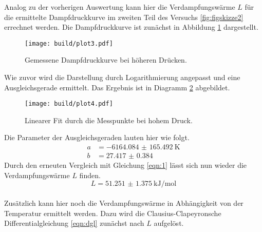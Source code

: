 Analog zu der vorherigen Auswertung kann hier die Verdampfungswärme $L$ für die ermittelte Dampfdruckkurve im zweiten Teil des Versuchs \ref{fig:figskizze2} errechnet werden.
Die Dampfdruckkurve ist zunächst in Abbildung \ref{fig:plot3} dargestellt.
\begin{figure}[h]
    \centering
    \texttt{[image: build/plot3.pdf]}
    \caption{Gemessene Dampfdruckkurve bei höheren Drücken.}
    \label{fig:plot3}
\end{figure}
Wie zuvor wird die Darstellung durch Logarithmierung angepasst und eine Ausgleichsgerade ermittelt. Das Ergebnis ist in Diagramm \ref{fig:plot4} abgebildet.
\begin{figure}[h]
    \centering
    \texttt{[image: build/plot4.pdf]}
    \caption{Linearer Fit durch die Messpunkte bei hohem Druck.}
    \label{fig:plot4}
\end{figure}
Die Parameter der Ausgleichsgeraden lauten hier wie folgt.
\begin{align}
    a &= \SI{-6164.084(165492)}{\kelvin} \\
    b &= \SI{27.417(0384)}{}
\end{align}
Durch den erneuten Vergleich mit Gleichung \eqref{eqn:1} lässt sich nun wieder die Verdampfungswärme $L$ finden.
\begin{equation}
L = \SI{51.251(1375)}{\kilo\joule\per\mol}
\end{equation}
\\
Zusätzlich kann hier noch die Verdampfungswärme in Abhängigkeit von der Temperatur ermittelt werden. Dazu wird die Clausius-Clapeyronsche
Differentialgleichung \eqref{eqn:dgl} zunächst nach $L$ aufgelöst.

